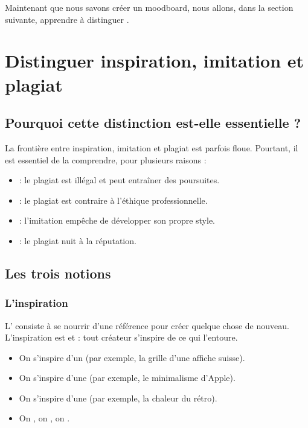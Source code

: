 Maintenant que nous savons créer un moodboard, nous allons, dans la section suivante, apprendre à distinguer .

\section{Distinguer inspiration, imitation et plagiat}

\subsection{Pourquoi cette distinction est-elle essentielle ?}

La frontière entre inspiration, imitation et plagiat est parfois floue. Pourtant, il est essentiel de la comprendre, pour plusieurs raisons :

\begin{itemize}
    \item {} : le plagiat est illégal et peut entraîner des poursuites.
    \item {} : le plagiat est contraire à l'éthique professionnelle.
    \item {} : l'imitation empêche de développer son propre style.
    \item {} : le plagiat nuit à la réputation.
\end{itemize}

\subsection{Les trois notions}

\subsubsection{L'inspiration}

L' consiste à se nourrir d'une référence pour créer quelque chose de nouveau. L'inspiration est  et  : tout créateur s'inspire de ce qui l'entoure.

\begin{itemize}
    \item On s'inspire d'un  (par exemple, la grille d'une affiche suisse).
    \item On s'inspire d'une  (par exemple, le minimalisme d'Apple).
    \item On s'inspire d'une  (par exemple, la chaleur du rétro).
    \item On , on , on .
\end{itemize}

